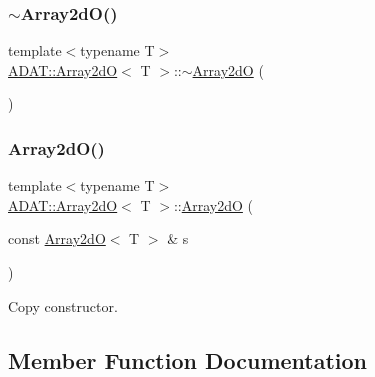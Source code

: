 \subsubsection{\texorpdfstring{$\sim$Array2dO()}{~Array2dO()}\hspace{0.1cm}{\footnotesize\ttfamily [3/3]}}
{\footnotesize\ttfamily template$<$typename T$>$ \\
\mbox{\hyperlink{classADAT_1_1Array2dO}{A\+D\+A\+T\+::\+Array2dO}}$<$ T $>$\+::$\sim$\mbox{\hyperlink{classADAT_1_1Array2dO}{Array2dO}} (\begin{DoxyParamCaption}{ }\end{DoxyParamCaption})\hspace{0.3cm}{\ttfamily [inline]}}

\mbox{\label{classADAT_1_1Array2dO_a9d759d2058e98b6ce4b2e1a373075bc0}} 
\subsubsection{\texorpdfstring{Array2dO()}{Array2dO()}\hspace{0.1cm}{\footnotesize\ttfamily [12/12]}}
{\footnotesize\ttfamily template$<$typename T$>$ \\
\mbox{\hyperlink{classADAT_1_1Array2dO}{A\+D\+A\+T\+::\+Array2dO}}$<$ T $>$\+::\mbox{\hyperlink{classADAT_1_1Array2dO}{Array2dO}} (\begin{DoxyParamCaption}\item[{const \mbox{\hyperlink{classADAT_1_1Array2dO}{Array2dO}}$<$ T $>$ \&}]{s }\end{DoxyParamCaption})\hspace{0.3cm}{\ttfamily [inline]}}



Copy constructor. 



\subsection{Member Function Documentation}
\mbox{\label{classADAT_1_1Array2dO_a68d75259fbc18eb14504e3b6d74f2484}} 
